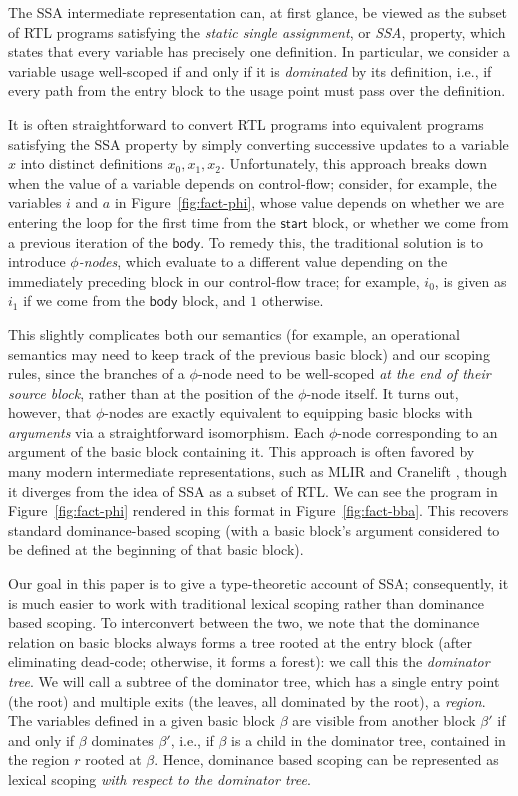 \documentclass[acmsmall,screen,review]{acmart}
\newcommand{\ms}[1]{\ensuremath{\mathsf{#1}}}
\begin{document}
The SSA intermediate representation can, at first glance, be viewed as the subset of RTL programs
satisfying the \emph{static single assignment}, or \emph{SSA}, property, which states that every
variable has precisely one definition. In particular, we consider a variable usage well-scoped if
and only if it is \emph{dominated} by its definition, i.e., if every path from the entry block to
the usage point must pass over the definition.

It is often straightforward to convert RTL programs into equivalent programs satisfying the SSA
property by simply converting successive updates to a variable $x$ into distinct definitions $x_0,
x_1, x_2$.  Unfortunately, this approach breaks down when the value of a variable depends on
control-flow; consider, for example, the variables $i$ and $a$ in Figure~\ref{fig:fact-phi}, whose
value depends on whether we are entering the loop for the first time from the \ms{start} block, or
whether we come from a previous iteration of the \ms{body}. To remedy this, the traditional solution
is to introduce \emph{$\phi$-nodes}, which evaluate to a different value depending on the
immediately preceding block in our control-flow trace; for example, $i_0$, is given as $i_1$ if we
come from the \ms{body} block, and $1$ otherwise.

This slightly complicates both our semantics (for example, an operational semantics may need to keep
track of the previous basic block) and our scoping rules, since the branches of a $\phi$-node need
to be well-scoped \emph{at the end of their source block}, rather than at the position of the
$\phi$-node itself. It turns out, however, that $\phi$-nodes are exactly equivalent to equipping
basic blocks with \emph{arguments} via a straightforward isomorphism. Each $\phi$-node corresponding
to an argument of the basic block containing it. This approach is often favored by many modern
intermediate representations, such as MLIR \cite{mlir} and Cranelift \cite{cranelift}, though it
diverges from the idea of SSA as a subset of RTL. We can see the program in
Figure~\ref{fig:fact-phi} rendered in this format in Figure~\ref{fig:fact-bba}. This recovers
standard dominance-based scoping (with a basic block's argument considered to be defined at the
beginning of that basic block).

Our goal in this paper is to give a type-theoretic account of SSA; consequently, it is much easier
to work with traditional lexical scoping rather than dominance based scoping. To interconvert
between the two, we note that the dominance relation on basic blocks always forms a tree rooted at
the entry block (after eliminating dead-code; otherwise, it forms a forest): we call this the
\emph{dominator tree}. We will call a subtree of the dominator tree, which has a single entry point
(the root) and multiple exits (the leaves, all dominated by the root), a \emph{region}. The
variables defined in a given basic block $\beta$ are visible from another block $\beta'$ if and only
if $\beta$ dominates $\beta'$, i.e., if $\beta$ is a child in the dominator tree, contained in the
region $r$ rooted at $\beta$. Hence, dominance based scoping can be represented as lexical scoping
\emph{with respect to the dominator tree}.
\end{document}

